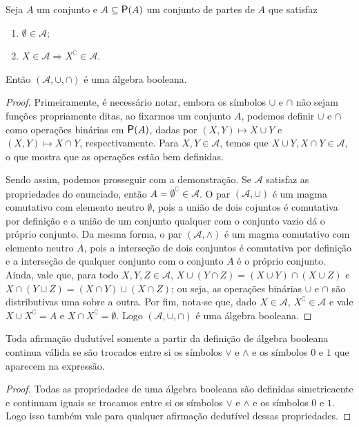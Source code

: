 \begin{proposition}
\label{prop:algeb.subconj}
	Seja $A$ um conjunto e $\mathcal A \subseteq \p(A)$ um conjunto de partes de $A$ que satisfaz
	\begin{enumerate}
	\item $\emptyset \in \mathcal A$;
	\item $X \in \mathcal A \Rightarrow X^\complement \in \mathcal A$.
	\end{enumerate}
Então $(\mathcal A,\cup,\cap)$ é uma álgebra booleana.
\end{proposition}
\begin{proof}
	Primeiramente, é necessário notar, embora os símbolos $\cup$ e $\cap$ não sejam funções propriamente ditas, ao fixarmos um conjunto $A$, podemos definir $\cup$ e $\cap$ como operações binárias em $\p(A)$, dadas por $(X,Y) \mapsto X \cup Y$ e $(X,Y) \mapsto X \cap Y$, respectivamente. Para $X,Y \in \mathcal A$, temos que $X \cup Y,X \cap Y \in \mathcal A$, o que mostra que as operações estão bem definidas.

	Sendo assim, podemos prosseguir com a demonstração. Se $\mathcal A$ satisfaz as propriedades do enunciado, então $A = \emptyset^\complement \in \mathcal A$. O par $(\mathcal A,\cup)$ é um magma comutativo com elemento neutro $\emptyset$, pois a união de dois cojuntos é comutativa por definição e a união de um conjunto qualquer com o conjunto vazio dá o próprio conjunto. Da mesma forma, o par $(\mathcal A,\wedge)$ é um magma comutativo com elemento neutro $A$, pois a interseção de dois conjuntos é comutativa por definição e a interseção de qualquer conjunto com o conjunto $A$ é o próprio conjunto. Ainda, vale que, para todo $X,Y,Z \in \mathcal A$, $X \cup (Y \cap Z) = (X \cup Y) \cap (X \cup Z)$ e $X \cap (Y \cup Z) = (X \cap Y) \cup (X \cap Z)$; ou seja, as operações binárias $\cup$ e $\cap$ são distributivas uma sobre a outra. Por fim, nota-se que, dado $X \in \mathcal A$, $X^\complement \in \mathcal A$ e vale $X \cup X^\complement = A$ e $X \cap X^\complement = \emptyset$. Logo $(\mathcal A,\cup,\cap)$ é uma álgebra booleana.
\end{proof}

\begin{proposition}
	Toda afirmação dudutível somente a partir da definição de álgebra booleana continua válida se são trocados entre si os símbolos $ \vee $ e $\wedge$ e os símbolos $0$ e $1$ que aparecem na expressão.
\end{proposition}
\begin{proof}
	Todas as propriedades de uma álgebra booleana são definidas simetricaente e continuam iguais se trocamos entre si os símbolos $ \vee $ e $\wedge$ e os símbolos $0$ e $1$. Logo isso também vale para qualquer afirmação dedutível dessas propriedades.
\end{proof}

